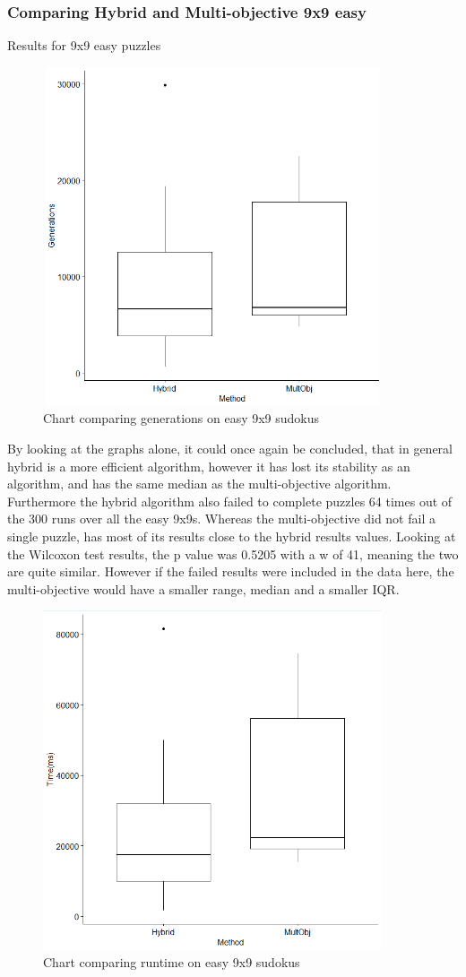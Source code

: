\documentclass[a4paper,11pt]{article}
\begin{document}
\subsubsection{Comparing Hybrid and Multi-objective 9x9 easy}
Results for 9x9 easy puzzles
\begin{figure}[h]
	\centering
	\includegraphics[height=10cm,width=10cm]{./Diagrams/barChartComparing9x9Easy}
	\caption{Chart comparing generations on easy 9x9 sudokus}
\end{figure}
By looking at the graphs alone, it could once again be concluded, that in general hybrid is a more efficient algorithm, however it has lost its stability as an algorithm, and has the same median as the multi-objective algorithm. Furthermore the hybrid algorithm also failed to complete puzzles 64 times out of the 300 runs over all the easy 9x9s. Whereas the multi-objective did not fail a single puzzle, has most of its results close to the hybrid results values. Looking at the Wilcoxon test results, the p value was 0.5205 with a w of 41, meaning the two are quite similar. However if the failed results were included in the data here, the multi-objective would have a smaller range, median and a smaller IQR.
\begin{figure}[h]
	\centering
	\includegraphics[height=10cm,width=10cm]{./Diagrams/barChart9x9EasyTime}
	\caption{Chart comparing runtime on easy 9x9 sudokus}
\end{figure}
\end{document}
